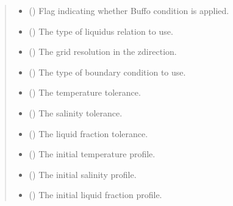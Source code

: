 \documentclass[a4paper,11pt,english,openany]{sphinxmanual}
\begin{document}
\begin{fulllineitems}
\begin{quote}
\begin{description}
\begin{itemize}
\item {} 
\sphinxAtStartPar
{} () \textendash{} Flag indicating whether Buffo condition is applied.

\item {} 
\sphinxAtStartPar
{} () \textendash{} The type of liquidus relation to use.

\item {} 
\sphinxAtStartPar
{} () \textendash{} The grid resolution in the z\sphinxhyphen{}direction.

\item {} 
\sphinxAtStartPar
{} () \textendash{} The type of boundary condition to use.

\item {} 
\sphinxAtStartPar
{} () \textendash{} The temperature tolerance.

\item {} 
\sphinxAtStartPar
{} () \textendash{} The salinity tolerance.

\item {} 
\sphinxAtStartPar
{} () \textendash{} The liquid fraction tolerance.

\item {} 
\sphinxAtStartPar
{} () \textendash{} The initial temperature profile.

\item {} 
\sphinxAtStartPar
{} () \textendash{} The initial salinity profile.

\item {} 
\sphinxAtStartPar
{} () \textendash{} The initial liquid fraction profile.


\end{itemize}
\end{description}
\end{quote}
\end{fulllineitems}
\end{document}
